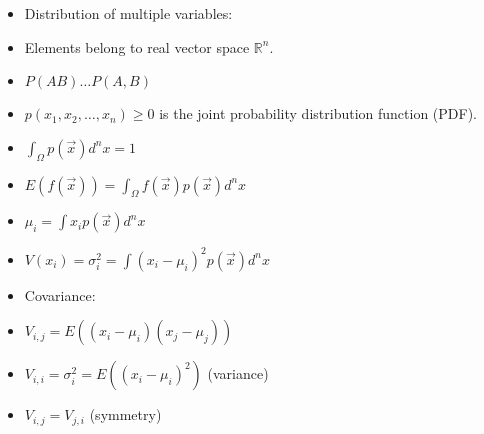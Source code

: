 \begin{itemize}
    \item Distribution of multiple variables:
    \item Elements belong to real vector space $\mathbb{R}^n$.
    \item $P(AB) \dots P(A,B)$
    \item $p(x_1, x_2, \ldots, x_n) \ge 0$ is the joint probability distribution function (PDF).
    \item $\int_{\Omega} p(\vec{x}) d^n x = 1$
    \item $E(f(\vec{x})) = \int_{\Omega} f(\vec{x}) p(\vec{x}) d^n x$
    \item $\mu_i = \int x_i p(\vec{x}) d^n x$
    \item $V(x_i) = \sigma_i^2 = \int (x_i - \mu_i)^2 p(\vec{x}) d^n x$
    \item Covariance:
    \item $V_{i,j} = E((x_i-\mu_i)(x_j-\mu_j))$
    \item $V_{i,i} = \sigma_i^2 = E((x_i-\mu_i)^2)$ (variance)
    \item $V_{i,j} = V_{j,i}$ (symmetry)
\end{itemize}
